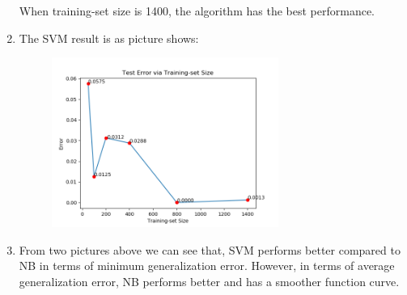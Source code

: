 \documentclass[12pt]{article}
\begin{document}
\begin{enumerate}[label=(\alph*)]
\begin{figure}[H]
        \end{figure}
        When training-set size is 1400, the algorithm has the best performance.
        \item The SVM result is as picture shows:
        \begin{figure}[H]
            \centering
            \includegraphics[width=0.70\textwidth]{Q6/svm_error.png}
        \end{figure}
        \item From two pictures above we can see that, SVM performs better compared to NB in terms of minimum generalization error.
        However, in terms of average generalization error, NB performs better and has a smoother function curve.
    \end{enumerate}
\end{document}
